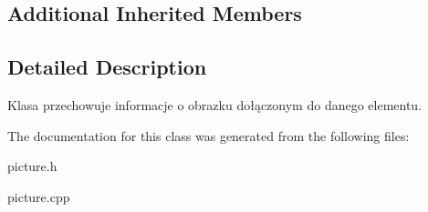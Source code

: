 \subsection*{Additional Inherited Members}


\subsection{Detailed Description}
Klasa przechowuje informacje o obrazku dołączonym do danego elementu. 

The documentation for this class was generated from the following files\+:\begin{DoxyCompactItemize}
\item 
picture.\+h\item 
picture.\+cpp\end{DoxyCompactItemize}
